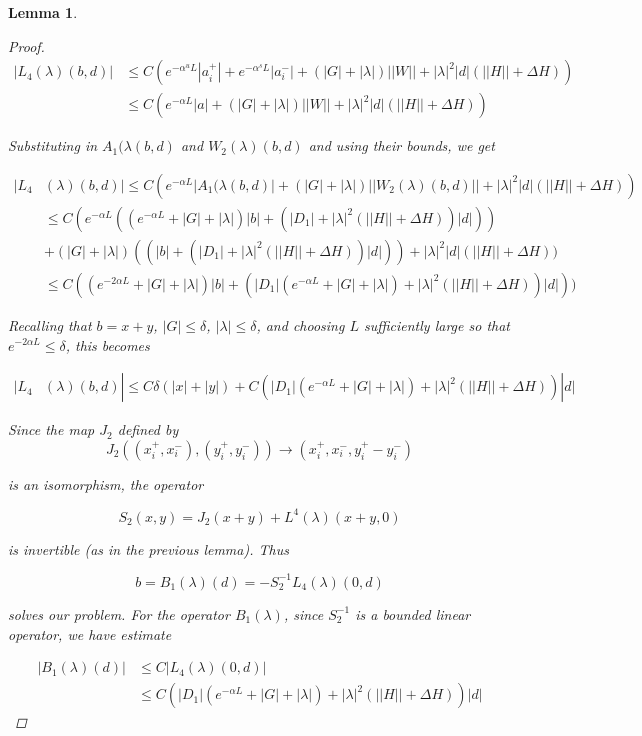 \documentclass[12pt]{article}
\newtheorem{lemma}{Lemma}
\begin{document}
\begin{lemma}
\begin{proof}
\begin{align*}
|L_4(\lambda)(b,d)| &\leq C\left( e^{-\alpha^u L}|a_i^+| +  e^{-\alpha^s L}|a_i^-|
+ (|G| + |\lambda|)||W|| + |\lambda|^2|d|(||H|| + \Delta H ) \right) \\
&\leq C\left( e^{-\alpha L}|a|
+ (|G| + |\lambda|)||W|| + |\lambda|^2|d|(||H|| + \Delta H ) \right)
\end{align*}

Substituting in $A_1(\lambda(b,d)$ and $W_2(\lambda)(b,d)$ and using their bounds, we get

\begin{align*}
|L_4&(\lambda)(b,d)| \leq C\left( e^{-\alpha L}|A_1(\lambda(b,d)|
+ (|G| + |\lambda|)||W_2(\lambda)(b,d)|| + |\lambda|^2|d|(||H|| + \Delta H ) \right) \\
&\leq C( e^{-\alpha L}((e^{-\alpha L} + |G| + |\lambda|)|b| + (|D_1| + |\lambda|^2(||H|| + \Delta H ))|d| )) \\
&+ (|G| + |\lambda|)((|b| + (|D_1| + |\lambda|^2(||H|| + \Delta H ))|d|) )+ |\lambda|^2|d|(||H|| + \Delta H ) ) \\
&\leq C( (e^{-2 \alpha L} + |G| + |\lambda|)|b| + (|D_1|(e^{-\alpha L} + |G| + |\lambda|) + |\lambda|^2(||H|| + \Delta H ))|d|))
\end{align*}

Recalling that $b = x + y$, $|G| \leq \delta$, $|\lambda| \leq \delta$, and choosing $L$ sufficiently large so that $e^{-2 \alpha L} \leq \delta$, this becomes

\begin{align*}
|L_4&(\lambda)(b,d)| \leq C\delta(|x| + |y|) + C(|D_1|(e^{-\alpha L} + |G| + |\lambda|) + |\lambda|^2(||H|| + \Delta H ))|d|
\end{align*}

Since the map $J_2$ defined by
\[
J_2( (x_i^+, x_i^-),(y_i^+, y_i^-)) \rightarrow ( x_i^+, x_i^-, y_i^+ -  y_i^- )
\]

is an isomorphism, the operator

\[
S_2(x,y) = J_2(x+y) + L^4(\lambda)(x+y,0)
\]

is invertible (as in the previous lemma). Thus

\[
b = B_1(\lambda)(d) = -S_2^{-1}L_4(\lambda)(0,d)
\]

solves our problem. For the operator $B_1(\lambda)$, since $S_2^{-1}$ is a bounded linear operator, we have estimate

\begin{align*}
|B_1(\lambda)(d)| &\leq C |L_4(\lambda)(0,d)| \\
&\leq C(|D_1|(e^{-\alpha L} + |G| + |\lambda|) + |\lambda|^2(||H|| + \Delta H ))|d|
\end{align*}


\end{proof}
\end{lemma}
\end{document}
